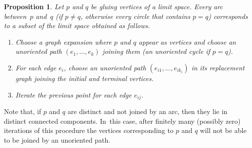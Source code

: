 \documentclass[JEP,XML,SOM,Unicode,NoFloatCountersInSection,published]{cedram}
\theoremstyle{plain}
\newtheorem{proposition}[theorem]{Proposition}
\theoremstyle{definition}
\theoremstyle{remark}
\begin{document}
\begin{proposition}
\label{prop.arcs.paths}
Let $p$ and $q$ be gluing vertices of a limit space.
Every arc between~$p$ and~$q$ (if $p \neq q$, otherwise every circle that contains $p=q$) corresponds to a subset of the limit space obtained as follows.
\begin{enumerate}
\item Choose a graph expansion where $p$ and $q$ appear as vertices and choose an unoriented path $(e_1, \dots, e_k)$ joining them (an unoriented cycle if $p=q$).
\item For each edge $e_i$, choose an unoriented path $(e_{i1}, \dots, e_{ik_{i}})$ in its replacement graph joining the initial and terminal vertices.
\item Iterate the previous point for each edge $e_{ij}$.
\end{enumerate}
\end{proposition}

Note that, if $p$ and $q$ are distinct and not joined by an arc, then they lie in distinct connected components. In~this case, after finitely many (possibly zero) iterations of this procedure the vertices corresponding to $p$ and $q$ will not be able to be joined by an unoriented path.
\end{document}
